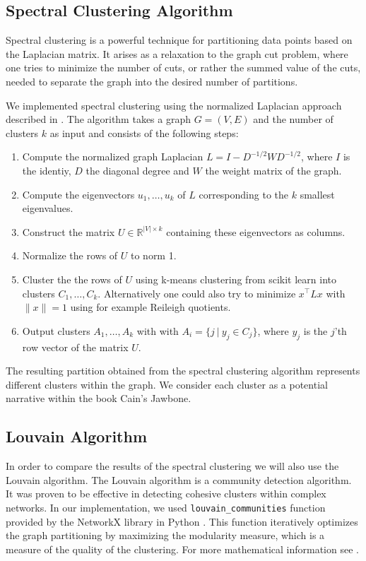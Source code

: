 \documentclass[a4paper]{article}
\begin{document}
\subsection{Spectral Clustering Algorithm}

Spectral clustering is a powerful technique for partitioning data points based on the Laplacian matrix. It arises as a relaxation to the graph cut problem, where one tries to minimize the number of cuts, or rather the summed value of the cuts, needed to separate the graph into the desired number of partitions.

We implemented spectral clustering using the normalized Laplacian approach described in \cite{spectral}. The algorithm takes a graph $G = (V, E)$ and the number of clusters $k$ as input and consists of the following steps:

\begin{enumerate}
    \item Compute the normalized graph Laplacian $L = I - D^{-1/2} W D^{-1/2}$, where $I$ is the identiy, $D$ the diagonal degree and $W$ the weight matrix of the graph.
    \item Compute the eigenvectors $u_1, \dots, u_k$ of $L$ corresponding to the $k$ smallest eigenvalues.
    \item Construct the matrix $U \in \mathbb{R}^{|V| \times k}$ containing these eigenvectors as columns.
    \item Normalize the rows of $U$ to norm 1.
    \item Cluster the the rows of $U$ using k-means clustering from scikit learn \cite{sklearn} into clusters $C_1, \dots, C_k$. Alternatively one could also try to minimize $x^\top L x$ with $\|x\|=1$ using for example Reileigh quotients.
    \item Output clusters $A_1, \dots, A_k$ with with $A_{i} = \{j \ | \ y_{j} \in C_{j}\}$, where $y_{j}$ is the $j$'th row vector of the matrix $U$.
\end{enumerate}

The resulting partition obtained from the spectral clustering algorithm represents different clusters within the graph. We consider each cluster as a potential narrative within the book Cain's Jawbone.


\subsection{Louvain Algorithm}

In order to compare the results of the spectral clustering we will also use the Louvain algorithm. The Louvain algorithm is a community detection algorithm. It was proven to be effective in detecting cohesive clusters within complex networks. In our implementation, we used \verb|louvain_communities| function provided by the NetworkX library in Python \cite{networkx}. This function iteratively optimizes the graph partitioning by maximizing the modularity measure, which is a measure of the quality of the clustering. For more mathematical information see \cite{louvain}.
\end{document}
